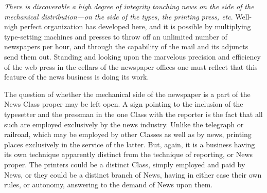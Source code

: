 \documentclass[twoside,symmetric,nobib,justified]{tufte-book}
\begin{document}
\vspace{0.05in}

\emph{There is discoverable a high degree of integrity touching news on
the side of the mechanical distribution---on the side of the types, the
printing press, etc}. Well-nigh perfect organization has developed here,
and it is possible by multiplying type-setting machines and presses to
throw off an unlimited number of newspapers per hour, and through the
capability of the mail and its adjuncts send them out. Standing and
looking upon the marvelous precision and efficiency of the web press in
the cellars of the newspaper offices one must reflect that this feature
of the news business is doing its work.~

The question of whether the mechanical side of the newspaper is a part
of the News Class proper may be left open. A sign pointing to the
inclusion of the typesetter and the pressman in the one Class with the
reporter is the fact that all such are employed exclusively by the news
industry. Unlike the telegraph or railroad, which may be employed by
other Classes as well as by news, printing places exclusively in the
service of the latter. But, again, it is a business having its own
technique apparently distinct from the technique of reporting, or News
proper. The printers could be a distinct Class, simply employed and paid
by News, or they could be a distinct branch of News, having in either
case their own rules, or autonomy, answering to the demand of News upon
them.~

\vspace{0.05in}
\end{document}
